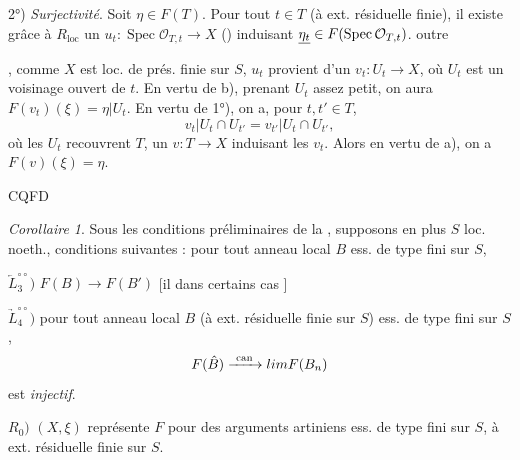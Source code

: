 \documentclass[11pt,a4paper]{article}
\begin{document}
2°) \emph{Surjectivité}. Soit $\eta \in F(T)$. Pour tout $t \in T$ (à ext.
résiduelle finie), il existe grâce à $R_{\mathrm{loc}}$ un
$u_t : \operatorname{Spec} \mathcal{O}_{T,t} \to X$
() induisant
$\uncertain{\eta_t} \in F(\operatorname{Spec} \mathcal{O}_{T,t})$.
 outre

, comme $X$ est loc. de prés. finie sur $S$, $u_t$
provient d'un 
$v_t : U_t \to X$, où $U_t$ est un voisinage ouvert de $t$. En vertu de b),
prenant $U_t$ assez petit, on aura $F(v_t)(\xi) = \eta | U_t$.
En vertu de 1°), on a, pour $t, t' \in T$,
\[
  v_t | U_t \cap U_{t'} = v_{t'} | U_t \cap U_{t'} ,
\]
où les $U_t$ recouvrent $T$, \ill{} un $v : T \to X$ 
induisant les $v_t$.
Alors en vertu de a), on a $F(v)(\xi) = \eta$.

CQFD

\emph{Corollaire 1}. Sous les conditions préliminaires de la
, supposons en plus $S$ loc. noeth.,   conditions
suivantes  : pour tout anneau local $B$ ess. de type fini sur $S$,

$\underleftarrow{L}_3^{\circ\circ})$  $F(B) \to F(B')$   [il  \ill{} dans certains
cas \ill{}]

$\underrightarrow{L}_4^{\circ\circ})$  pour tout anneau
local $B$ (à ext. résiduelle finie sur $S$) ess. de type fini sur $S$,
\[
  F(\hat{B}) \xrightarrow{\ \mathrm{can}\ } \varprojlim F(B_n)
\]
est \emph{injectif}.

$R_0)$ $(X, \xi)$ représente $F$ pour des arguments artiniens ess. de type
fini sur $S$, à ext. résiduelle finie sur $S$.
\end{document}
